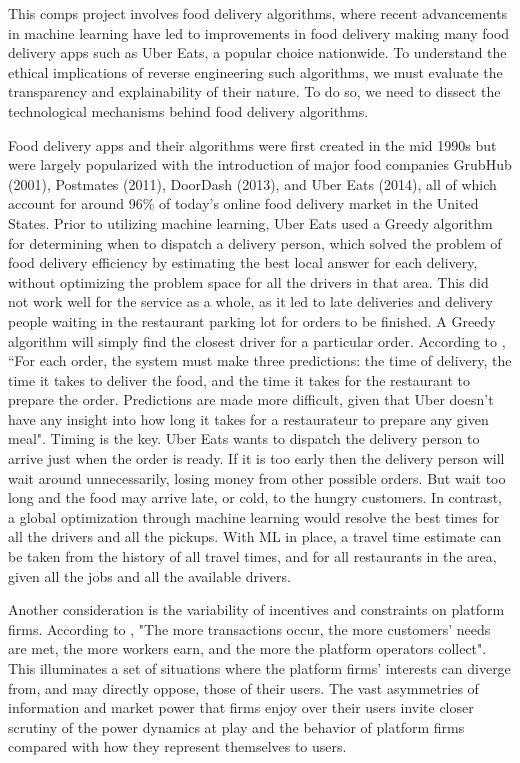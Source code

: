 \documentclass[10pt,twocolumn]{article}
\begin{document}
This comps project involves food delivery algorithms, where recent advancements in machine learning have led to improvements in food delivery making many food delivery apps such as Uber Eats, a popular choice nationwide. To understand the ethical implications of reverse engineering such algorithms, we must evaluate the transparency and explainability of their nature. To do so, we need to dissect the technological mechanisms behind food delivery algorithms.

Food delivery apps and their algorithms were first created in the mid 1990s but were largely popularized with the introduction of major food companies GrubHub (2001), Postmates (2011), DoorDash (2013), and Uber Eats (2014), all of which account for around 96\% of today's online food delivery market in the United States. Prior to utilizing machine learning, Uber Eats used a Greedy algorithm for determining when to dispatch a delivery person, which solved the problem of food delivery efficiency by estimating the best local answer for each delivery, without optimizing the problem space for all the drivers in that area. This did not work well for the service as a whole, as it led to late deliveries and delivery people waiting in the restaurant parking lot for orders to be finished. A Greedy algorithm will simply find the closest driver for a particular order. According to , ``For each order, the system must make three predictions: the time of delivery, the time it takes to deliver the food, and the time it takes for the restaurant to prepare the order. Predictions are made more difficult, given that Uber doesn’t have any insight into how long it takes for a restaurateur to prepare any given meal". Timing is the key. Uber Eats wants to dispatch the delivery person to arrive just when the order is ready. If it is too early then the delivery person will wait around unnecessarily, losing money from other possible orders. But wait too long and the food may arrive late, or cold, to the hungry customers. In contrast, a global optimization through machine learning would resolve the best times for all the drivers and all the pickups. With ML in place, a travel time estimate can be taken from the history of all travel times, and for all restaurants in the area, given all the jobs and all the available drivers. 

Another consideration is the variability of incentives and constraints on platform firms. According to , "The more transactions occur, the more customers’ needs are met, the more workers earn, and the more the platform operators collect". This illuminates a set of situations where the platform firms' interests can diverge from, and may directly oppose, those of their users. The vast asymmetries of information and market power that firms enjoy over their users invite closer scrutiny of the power dynamics at play and the behavior of platform firms compared with how they represent themselves to users.
\end{document}
